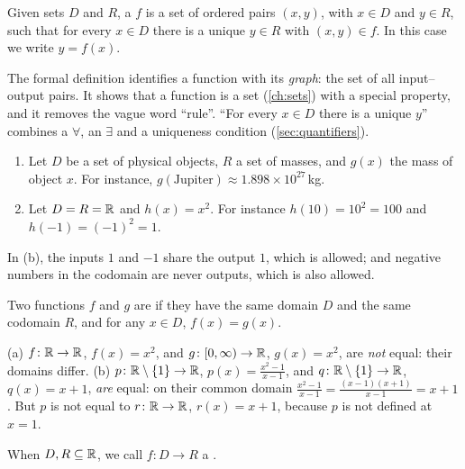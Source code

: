 \begin{definition}
Given sets $D$ and $R$, a  $f$ is a set of ordered pairs $(x,y)$, with $x\in D$ and $y\in R$, such that for
every $x\in D$ there is a unique $y\in R$ with $(x,y)\in f$. In this case we write $y=f(x)$. 
\end{definition}

The formal definition identifies a function with its \emph{graph}: the set of all input--output pairs. It shows that a
function is a set (\cref{ch:sets}) with a special property, and it removes the vague word ``rule''. ``For every $x\in D$
there is a unique $y$'' combines a $\forall$, an $\exists$ and a uniqueness condition (\cref{sec:quantifiers}).

\begin{example}
\begin{enumerate}
  \item Let $D$ be a set of physical objects, $R$ a set of masses, and $g(x)$ the mass of object $x$. For instance,
  $g(\text{Jupiter})\approx1.898\times10^{27}$\,kg.
  \item Let $D=R=\mathbb{R}$ and $h(x)=x^2$. For instance $h(10)=10^2=100$ and $h(-1)=(-1)^2=1$.
\end{enumerate}
In (b), the inputs $1$ and $-1$ share the output $1$, which is allowed; and negative numbers in the codomain are never
outputs, which is also allowed.
\end{example}

\begin{definition}
Two functions $f$ and $g$ are  if they have the same domain $D$ and the same codomain $R$, and for any
$x\in D$, $f(x)=g(x)$. 
\end{definition}

\begin{example}
(a) $f\colon\mathbb{R}\to\mathbb{R}$, $f(x)=x^2$, and $g\colon[0,\infty)\to\mathbb{R}$, $g(x)=x^2$, are \emph{not} equal: their domains differ.
(b) $p\colon\mathbb{R}\setminus\{1\}\to\mathbb{R}$, $p(x)=\frac{x^2-1}{x-1}$, and $q\colon\mathbb{R}\setminus\{1\}\to\mathbb{R}$, $q(x)=x+1$, \emph{are}
equal: on their common domain $\frac{x^2-1}{x-1}=\frac{(x-1)(x+1)}{x-1}=x+1$. But $p$ is not equal to
$r\colon\mathbb{R}\to\mathbb{R}$, $r(x)=x+1$, because $p$ is not defined at $x=1$.
\end{example}

\begin{definition}
When $D,R\subseteq\mathbb{R}$, we call $f\colon D\to R$ a . 
\end{definition}

